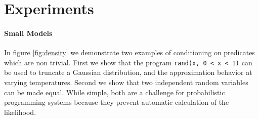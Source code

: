\section{Experiments}


\paragraph{Small Models}
In figure \ref{fig:density} we demonstrate two examples of conditioning on predicates which are non trivial.
First we show that the program \texttt{rand(x, 0 < x < 1)} can be used to truncate a Gaussian distribution, and the approximation behavior at varying temperatures.  Second we show that two independent random variables can be made equal.  While simple, both are a challenge for probabilistic programming systems because they prevent automatic calculation of the likelihood.

